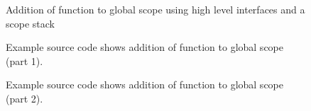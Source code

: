 \begin{figure}[!h]
{\indent
{\mySmallestFontSize
\begin{latexonly}
  
\end{latexonly}

\begin{htmlonly}
   
\end{htmlonly}

}
}
\caption{Addition of function to global scope using high level interfaces
  and a scope stack}
\label{Tutorial:exampleAddFunctionDeclaration3}
\end{figure}


\begin{figure}[!h]
{\indent
{\mySmallestFontSize
\begin{latexonly}
%  
   
\end{latexonly}

\begin{htmlonly}
   
\end{htmlonly}

}
}
\caption{Example source code shows addition of function to global scope (part 1).}
\label{Tutorial:exampleAddFunctionDeclarationA}
\end{figure}

\begin{figure}[!h]
{\indent
{\mySmallestFontSize
\begin{latexonly}
%  
   
\end{latexonly}

\begin{htmlonly}
   
\end{htmlonly}

}
}
\caption{Example source code shows addition of function to global scope (part 2).}
\label{Tutorial:exampleAddFunctionDeclarationB}
\end{figure}

